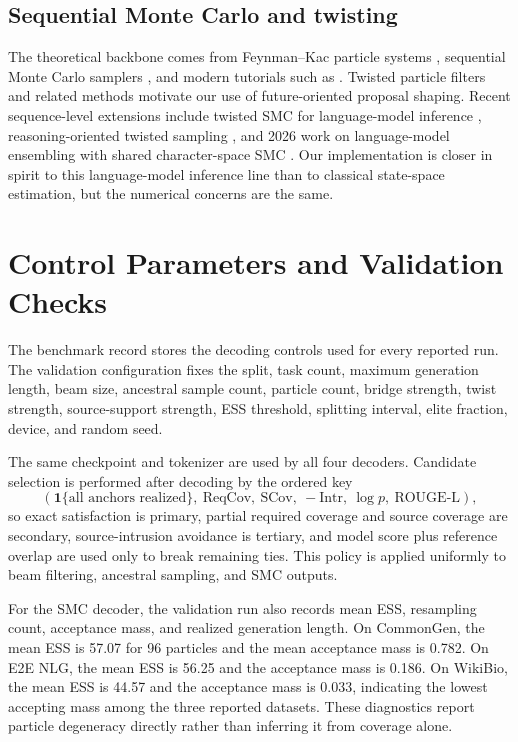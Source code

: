 \documentclass[11pt]{article}
\begin{document}
\subsection{Sequential Monte Carlo and twisting}
The theoretical backbone comes from Feynman--Kac particle systems \citep{delmoral2004feynman}, sequential Monte Carlo samplers \citep{delmoral2006smc}, and modern tutorials such as \citet{naesseth2019elements}. Twisted particle filters and related methods \citep{whiteley2014twisted,guarniero2017iterated} motivate our use of future-oriented proposal shaping. Recent sequence-level extensions include twisted SMC for language-model inference \citep{zhao2024probabilistic}, reasoning-oriented twisted sampling \citep{wu2024step}, and 2026 work on language-model ensembling with shared character-space SMC \citep{chan2026ensembling}. Our implementation is closer in spirit to this language-model inference line than to classical state-space estimation, but the numerical concerns are the same.

\section{Control Parameters and Validation Checks}
The benchmark record stores the decoding controls used for every reported run. The validation configuration fixes the split, task count, maximum generation length, beam size, ancestral sample count, particle count, bridge strength, twist strength, source-support strength, ESS threshold, splitting interval, elite fraction, device, and random seed.

The same checkpoint and tokenizer are used by all four decoders. Candidate selection is performed after decoding by the ordered key
\[
(\mathbf{1}\{\text{all anchors realized}\},\ \mathrm{ReqCov},\ \mathrm{SCov},\ -\mathrm{Intr},\ \log p,\ \mathrm{ROUGE\mbox{-}L}),
\]
so exact satisfaction is primary, partial required coverage and source coverage are secondary, source-intrusion avoidance is tertiary, and model score plus reference overlap are used only to break remaining ties. This policy is applied uniformly to beam filtering, ancestral sampling, and SMC outputs.

For the SMC decoder, the validation run also records mean ESS, resampling count, acceptance mass, and realized generation length. On CommonGen, the mean ESS is 57.07 for 96 particles and the mean acceptance mass is 0.782. On E2E NLG, the mean ESS is 56.25 and the acceptance mass is 0.186. On WikiBio, the mean ESS is 44.57 and the acceptance mass is 0.033, indicating the lowest accepting mass among the three reported datasets. These diagnostics report particle degeneracy directly rather than inferring it from coverage alone.
\end{document}

